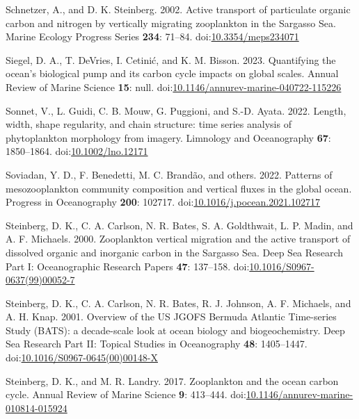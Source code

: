 \documentclass[
]{article}
\newlength{\cslhangindent}
\newlength{\cslentryspacingunit} %
\newenvironment{CSLReferences}[2] %
 {%
  \setlength{\parindent}{0pt}
  \ifodd #1
  \let\oldpar\par
  \def\par{\hangindent=\cslhangindent\oldpar}
  \fi
  \setlength{\parskip}{#2\cslentryspacingunit}
 }%
 {}
\begin{document}
\begin{CSLReferences}{1}{0}
\leavevmode{}%
Schnetzer, A., and D. K. Steinberg. 2002. Active transport of
particulate organic carbon and nitrogen by vertically migrating
zooplankton in the Sargasso Sea. Marine Ecology Progress Series
\textbf{234}: 71--84.
doi:\href{https://doi.org/10.3354/meps234071}{10.3354/meps234071}

\leavevmode{}%
Siegel, D. A., T. DeVries, I. Cetinić, and K. M. Bisson. 2023.
Quantifying the ocean's biological pump and its carbon cycle impacts on
global scales. Annual Review of Marine Science \textbf{15}: null.
doi:\href{https://doi.org/10.1146/annurev-marine-040722-115226}{10.1146/annurev-marine-040722-115226}

\leavevmode{}%
Sonnet, V., L. Guidi, C. B. Mouw, G. Puggioni, and S.-D. Ayata. 2022.
Length, width, shape regularity, and chain structure: time series
analysis of phytoplankton morphology from imagery. Limnology and
Oceanography \textbf{67}: 1850--1864.
doi:\href{https://doi.org/10.1002/lno.12171}{10.1002/lno.12171}

\leavevmode{}%
Soviadan, Y. D., F. Benedetti, M. C. Brandão, and others. 2022. Patterns
of mesozooplankton community composition and vertical fluxes in the
global ocean. Progress in Oceanography \textbf{200}: 102717.
doi:\href{https://doi.org/10.1016/j.pocean.2021.102717}{10.1016/j.pocean.2021.102717}

\leavevmode{}%
Steinberg, D. K., C. A. Carlson, N. R. Bates, S. A. Goldthwait, L. P.
Madin, and A. F. Michaels. 2000. Zooplankton vertical migration and the
active transport of dissolved organic and inorganic carbon in the
Sargasso Sea. Deep Sea Research Part I: Oceanographic Research Papers
\textbf{47}: 137--158.
doi:\href{https://doi.org/10.1016/S0967-0637(99)00052-7}{10.1016/S0967-0637(99)00052-7}

\leavevmode{}%
Steinberg, D. K., C. A. Carlson, N. R. Bates, R. J. Johnson, A. F.
Michaels, and A. H. Knap. 2001. Overview of the US JGOFS Bermuda
Atlantic Time-series Study (BATS): a decade-scale look at ocean biology
and biogeochemistry. Deep Sea Research Part II: Topical Studies in
Oceanography \textbf{48}: 1405--1447.
doi:\href{https://doi.org/10.1016/S0967-0645(00)00148-X}{10.1016/S0967-0645(00)00148-X}

\leavevmode{}%
Steinberg, D. K., and M. R. Landry. 2017. Zooplankton and the ocean
carbon cycle. Annual Review of Marine Science \textbf{9}: 413--444.
doi:\href{https://doi.org/10.1146/annurev-marine-010814-015924}{10.1146/annurev-marine-010814-015924}


\end{CSLReferences}
\end{document}
